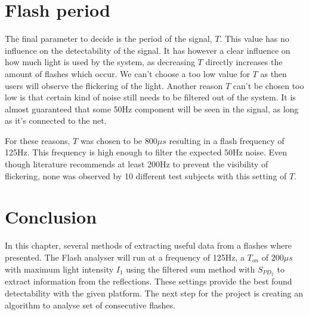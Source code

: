 \section{Flash period}
The final parameter to decide is the period of the signal, $T$. This value has no influence on the detectability of the signal. It has however a clear influence on how much light is used by the system, as decreasing $T$ directly increases the amount of flashes which occur. We can't choose a too low value for $T$ as then users will observe the flickering of the light. Another reason $T$ can't be chosen too low is that certain kind of noise still needs to be filtered out of the system. It is almost guaranteed that some 50Hz component will be seen in the signal, as long as it's connected to the net. 

For these reasons, $T$ was chosen to be 800$\mu s$ resulting in a flash frequency of 125Hz. This frequency is high enough to filter the expected 50Hz noise. Even though literature recommends at least 200Hz to prevent the visibility of flickering, none was observed by 10 different test subjects with this setting of $T$.

\section{Conclusion}
In this chapter, several methods of extracting useful data from a flashes where presented. 
The Flash analyser will run at a frequency of 125Hz, a $T_{on}$ of $200\mu s$ with maximum light intensity $I_1$ using the filtered sum method with $S_{PD_2}$ to extract information from the reflections. These settings provide the best found detectability with the given platform. The next step for the project is creating an algorithm to analyse set of consecutive flashes.